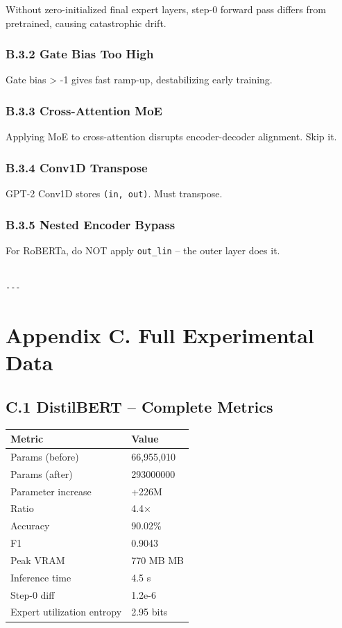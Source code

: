 Without zero-initialized final expert layers, step-0 forward pass differs 
from pretrained, causing catastrophic drift.

\subsubsection{B.3.2 Gate Bias Too High}

Gate bias \textgreater{} -1 gives fast ramp-up, destabilizing early training.

\subsubsection{B.3.3 Cross-Attention MoE}

Applying MoE to cross-attention disrupts encoder-decoder alignment. Skip it.

\subsubsection{B.3.4 Conv1D Transpose}

GPT-2 Conv1D stores \texttt{(in, out)}. Must transpose.

\subsubsection{B.3.5 Nested Encoder Bypass}

For RoBERTa, do NOT apply \texttt{out\_lin} -- the outer layer does it.
\begin{lstlisting}

---
\end{lstlisting}

\section{Appendix C. Full Experimental Data}

\subsection{C.1 DistilBERT -- Complete Metrics}

\begin{table}[H]
\centering
\small
\begin{tabular}{ll}
\toprule
\textbf{Metric} & \textbf{Value} \\
\midrule
Params (before) & 66,955,010 \\
Params (after) & 293000000 \\
Parameter increase & +226M \\
Ratio & 4.4$\times$ \\
Accuracy & 90.02\% \\
F1 & 0.9043 \\
Peak VRAM & 770 MB MB \\
Inference time & 4.5 s \\
Step-0 diff & 1.2e-6 \\
Expert utilization entropy & 2.95 bits \\
\bottomrule
\end{tabular}
\end{table}

